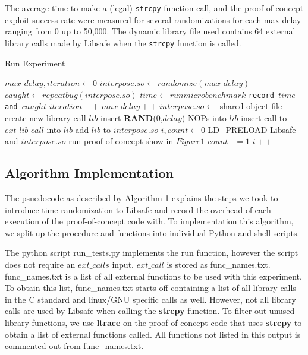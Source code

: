 \documentclass[letterpaper,twocolumn,10pt]{article}
\begin{document}
The average time to make a (legal) \texttt{strcpy} function call, and the proof of concept exploit success rate were measured for several randomizations for each max delay ranging from 0 up to 50,000.  The dynamic library file used contains 64 external library calls made by Libsafe when the \texttt{strcpy} function is called.

\begin{algorithm}
\caption{Run Experiment}
\begin{algorithmic}[1]
\State $max\_delay,iteration \gets 0$
		\State $interpose.so \gets randomize(max\_delay)$
		\State $caught \gets repeatbug(interpose.so)$
		\State $time \gets run microbenchmark$
		\State \texttt{record $time$ and $caught$}
		\State $iteration++$
	\EndWhile
	\State $max\_delay++$
\EndWhile
\EndFunction
\State
{}
\State $interpose.so \gets$ shared object file
	\State create new library call $lib$
	\State insert \textbf{RAND}(0,$delay$) NOPs into $lib$
	\State insert call to $ext\_lib\_call$ into $lib$
	\State add $lib$ to $interpose.so$
\EndFor
\State {}
\EndFunction
\State
{}
\State $i,count \gets 0$
	\State LD\_PRELOAD Libsafe and $interpose.so$
	\State run proof-of-concept show in $Figure 1$
		\State $count += 1$
	\EndIf
	\State $i++$
\EndWhile
\State {}
\EndFunction
\end{algorithmic}
\end{algorithm}
\subsection{Algorithm Implementation}
The psuedocode as described by Algorithm 1 explains the steps we took to introduce time randomization to Libsafe and record the overhead of each execution of the proof-of-concept code with.  To implementation this algorithm, we split up the procedure and functions into individual Python and shell scripts.

The python script run\_tests.py implements the run function, however the script does not require an $ext\_calls$ input.  $ext\_call$ is stored as func\_names.txt.  func\_names.txt is a list of all external functions to be used with this experiment.  To obtain this list, func\_names.txt starts off containing a list of all library calls in the C standard and linux/GNU specific calls as well. However, not all library calls are used by Libsafe when calling the \textbf{strcpy} function.  To filter out unused library functions, we use \textbf{ltrace} on the proof-of-concept code that uses \textbf{strcpy} to obtain a list of external functions called.  All functions not listed in this output is commented out from func\_names.txt.
\end{document}
